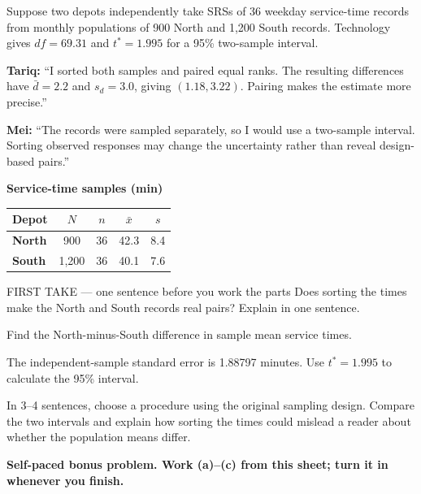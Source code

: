 \documentclass[14pt]{extarticle}
\begin{document}
\pagestyle{empty}


\noindent\begin{minipage}[t]{0.57\linewidth}
\vspace{0pt}
Suppose two depots independently take SRSs of 36 weekday service-time records from monthly populations of 900 North and 1,200 South records. Technology gives $df=69.31$ and $t^*=1.995$ for a 95\% two-sample interval.\par\smallskip \textbf{Tariq:} ``I sorted both samples and paired equal ranks. The resulting differences have $\bar d=2.2$ and $s_d=3.0$, giving $(1.18,3.22)$. Pairing makes the estimate more precise.''\par \textbf{Mei:} ``The records were sampled separately, so I would use a two-sample interval. Sorting observed responses may change the uncertainty rather than reveal design-based pairs.''\par
\end{minipage}\hfill
\begin{minipage}[t]{0.40\linewidth}
\vspace{0pt}
\begin{center}
\textbf{Service-time samples (min)}\par\smallskip
\begin{tabular}{|l|c|c|c|c|}
\hline
\textbf{Depot} & \textbf{$N$} & \textbf{$n$} & \textbf{$\bar x$} & \textbf{$s$} \\ \hline
\textbf{North} & 900 & 36 & 42.3 & 8.4 \\ \hline
\textbf{South} & 1,200 & 36 & 40.1 & 7.6 \\ \hline
\end{tabular}
\end{center}
\end{minipage}

\begin{firsttakebox}{FIRST TAKE --- one sentence before you work the parts}
Does sorting the times make the North and South records real pairs? Explain in one sentence.
\end{firsttakebox}

\begin{description}[leftmargin=1.15in, labelwidth=1in, itemsep=2pt, topsep=2pt]
  \item[\dokbadge{1}~(a)] Find the North-minus-South difference in sample mean service times.
  \item[\dokbadge{2}~(b)] The independent-sample standard error is 1.88797 minutes. Use $t^*=1.995$ to calculate the 95\% interval.
  \item[\dokbadge{3}~(c)] In 3--4 sentences, choose a procedure using the original sampling design. Compare the two intervals and explain how sorting the times could mislead a reader about whether the population means differ.
\end{description}

\vfill
\textbf{Self-paced bonus problem. Work (a)--(c) from this sheet; turn it in whenever you finish.}
\end{document}
